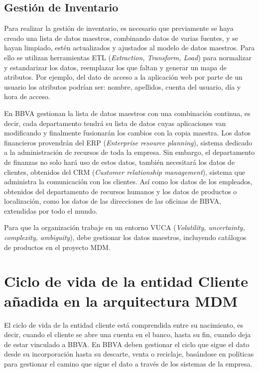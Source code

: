 \documentclass{article}
\begin{document}
\subsection{Gestión de Inventario}

Para realizar la gestión de inventario, es necesario que previamente se haya creado una lista de datos maestros, combinando datos de varias fuentes, y se hayan limpiado, estén actualizados y ajustados al modelo de datos maestros. Para ello se utilizan herramientas ETL (\textit{Extraction, Transform, Load}) para normalizar y estandarizar los datos, reemplazar los que faltan y generar un mapa de atributos. Por ejemplo, del dato de acceso a la aplicación web por parte de un usuario los atributos podrían ser: nombre, apellidos, cuenta del usuario, día y hora de acceso.

En BBVA gestionan la lista de datos maestros con una combinación continua, es decir, cada departamento tendrá su lista de datos cuyas aplicaciones van modificando y finalmente fusionarán los cambios con la copia maestra.
Los datos financieros provendrán del ERP (\textit{Enterprise resource planning}), sistema dedicado a la administración de recursos de toda la empresa.  Sin embargo, el departamento de finanzas no solo hará uso de estos datos, también necesitará los datos de clientes, obtenidos del CRM (\textit{Customer relationship management}), sistema que administra la comunicación con los clientes. Así como los datos de los empleados, obtenidos del departamento de recursos humanos y los datos de productos o localización, como los datos de las direcciones de las oficinas de BBVA, extendidas por todo el mundo. 


Para que la organización trabaje en un entorno VUCA (\textit{Volatility, uncertainty, complexity, ambiguity}), debe gestionar los datos maestros, incluyendo catálogos de productos en el proyecto MDM.

\section{Ciclo de vida de la entidad Cliente añadida en la arquitectura MDM}

El ciclo de vida de la entidad cliente está comprendida entre su nacimiento, es decir, cuando el cliente se abre una cuenta en el banco, hasta su fin, cuando deja de estar vinculado a BBVA.
En BBVA deben gestionar el ciclo que sigue el dato desde su incorporación hasta su descarte, venta o reciclaje, basándose en políticas para gestionar el camino que sigue el dato a través de los sistemas de la empresa.
\end{document}
